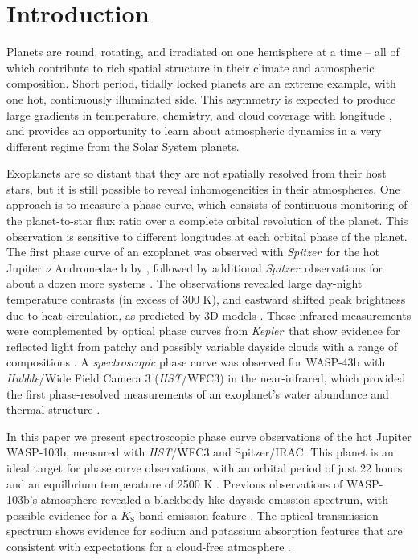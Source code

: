\documentclass[twocolumn, trackchanges]{aastex61}
\newcommand{\project}[1]{\textsl{#1}}
\newcommand{\HST}{\project{HST}}
\newcommand{\Spitzer}{\project{Spitzer}}
\newcommand{\Kepler}{\project{Kepler}}
\begin{document}


\section{Introduction} \label{sec:intro}
Planets are round, rotating, and irradiated on one hemisphere at a time -- all of which contribute to rich spatial structure in their climate and atmospheric composition.  Short period, tidally locked planets are an extreme example, with one hot, continuously illuminated side. This asymmetry is expected to produce large gradients in temperature, chemistry, and cloud coverage with longitude \citep{showman09, kataria16, parmentier16}, and provides an opportunity to learn about atmospheric dynamics in a very different regime from the Solar System planets.

Exoplanets are so distant that they are not spatially resolved from their host stars, but it is still possible to reveal inhomogeneities in their atmospheres. One approach is to measure a phase curve, which consists of continuous monitoring of the planet-to-star flux ratio over a complete orbital revolution of the planet. This observation is sensitive to different longitudes at each orbital phase of the planet.  The first phase curve of an exoplanet was observed with \Spitzer\ for the hot Jupiter $\nu$ Andromedae b by \cite{harrington06}, followed by additional \Spitzer\ observations for about a dozen more systems \citep[cataloged in][]{parmentier17}.  The observations revealed large day-night temperature contrasts (in excess of 300 K), and eastward shifted peak brightness due to heat circulation, as predicted by 3D models \citep{showman02}.  These infrared measurements were complemented by optical phase curves from \Kepler\ that show evidence for reflected light from patchy and possibly variable dayside clouds with a range of compositions \citep{borucki09, demory13, hu15, armstrong16, parmentier16}. A \emph{spectroscopic} phase curve was observed for WASP-43b with \emph{Hubble}/Wide Field Camera 3 (\HST/WFC3) in the near-infrared, which provided the first phase-resolved measurements of an exoplanet's water abundance and thermal structure \citep{stevenson14, stevenson17}.

In this paper we present spectroscopic phase curve observations of the hot Jupiter WASP-103b, measured with \HST/WFC3 and Spitzer/IRAC. This planet is an ideal target for phase curve observations, with an orbital period of just 22 hours and an equilbrium temperature of 2500 K \citep{gillon14}.  Previous observations of WASP-103b's atmosphere revealed a blackbody-like dayside emission spectrum, with possible evidence for a $K_\mathrm{S}$-band emission feature \citep{cartier17, delrez18}. The optical transmission spectrum shows evidence for sodium and potassium absorption features that are consistent with expectations for a cloud-free atmosphere \citep{lendl17}.%
\end{document}
